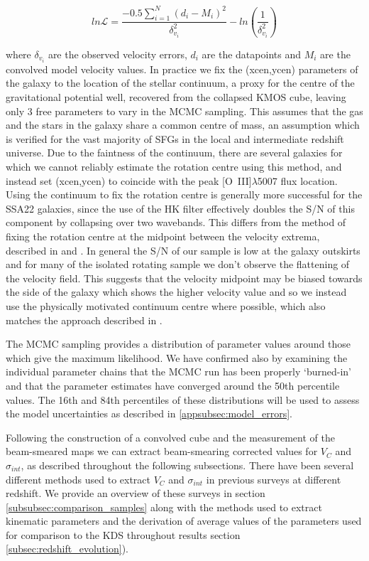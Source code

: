 \documentclass[fleqn,usenatbib]{mn2e}
\newcommand{\Lagr}{\mathcal{L}}
\begin{document}
\begin{equation}\label{eq:likelihood}
   ln\Lagr = \frac{-0.5\sum_{i=1}^{N}(d_{i} - M_{i})^{2}}{\delta_{v_{i}}^{2}} - ln\left(\frac{1}{\delta_{v_{i}}^{2}}\right)
\end{equation}

\noindent
where $\delta_{v_{i}}$ are the observed velocity errors, $d_{i}$ are the datapoints and $M_{i}$ are the convolved model velocity values.
In practice we fix the (xcen,ycen) parameters of the galaxy to the location of the stellar continuum, a proxy for the centre of the gravitational potential well, recovered from the collapsed KMOS cube, leaving only 3 free parameters to vary in the MCMC sampling.
This assumes that the gas and the stars in the galaxy share a common centre of mass, an assumption which is verified for the vast majority of SFGs in the local and intermediate redshift universe.
Due to the faintness of the continuum, there are several galaxies for which we cannot reliably estimate the rotation centre using this method, and instead set (xcen,ycen) to coincide with the peak [O~{\sc III}]$\lambda$5007 flux location.
Using the continuum to fix the rotation centre is generally more successful for the SSA22 galaxies, since the use of the HK filter effectively doubles the S/N of this component by collapsing over two wavebands.
This differs from the method of fixing the rotation centre at the midpoint between the velocity extrema, described in \cite{Wisnioski2015} and \cite{Rodrigues2016}.
In general the S/N of our sample is low at the galaxy outskirts and for many of the isolated rotating sample we don't observe the flattening of the velocity field.
This suggests that the velocity midpoint may be biased towards the side of the galaxy which shows the higher velocity value and so we instead use the physically motivated continuum centre where possible, which also matches the approach described in \cite{Harrison2017}.

The MCMC sampling provides a distribution of parameter values around those which give the maximum likelihood.
We have confirmed also by examining the individual parameter chains that the MCMC run has been properly `burned-in' and that the parameter estimates have converged around the 50th percentile values.
The 16th and 84th percentiles of these distributions will be used to assess the model uncertainties as described in \cref{appsubsec:model_errors}.

Following the construction of a convolved cube and the measurement of the beam-smeared maps we can extract beam-smearing corrected values for $V_{C}$ and $\sigma_{int}$, as described throughout the following subsections.
There have been several different methods used to extract $V_{C}$ and $\sigma_{int}$ in previous surveys at different redshift.
We provide an overview of these surveys in section \cref{subsubsec:comparison_samples} along with the methods used to extract kinematic parameters and the derivation of average values of the parameters used for comparison to the KDS throughout results section \cref{subsec:redshift_evolution}).
\end{document}
